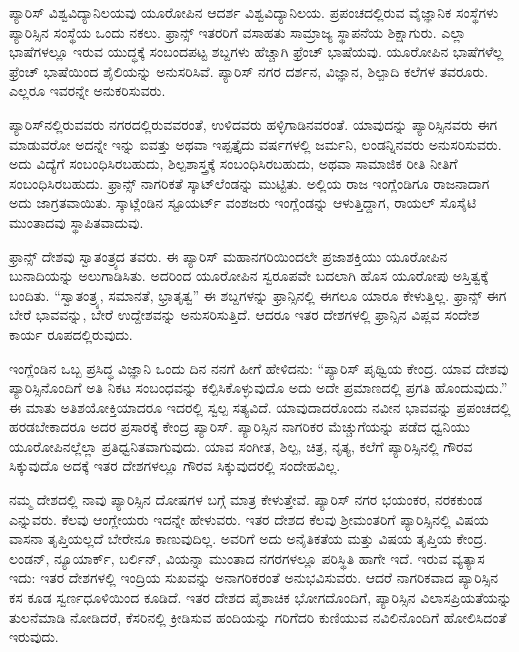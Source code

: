 \vskip 5pt

ಪ್ಯಾರಿಸ್​ ವಿಶ್ವವಿದ್ಯಾನಿಲಯವು ಯೂರೋಪಿನ ಆದರ್ಶ ವಿಶ್ವವಿದ್ಯಾನಿಲಯ. ಪ್ರಪಂಚದಲ್ಲಿರುವ ವೈಜ್ಞಾನಿಕ ಸಂಸ್ಥೆಗಳು ಪ್ಯಾರಿಸ್ಸಿನ ಸಂಸ್ಥೆಯ ಒಂದು ನಕಲು. ಫ್ರಾನ್ಸ್​ ಇತರರಿಗೆ ವಸಾಹತು ಸಾಮ್ರಾಜ್ಯ ಸ್ಥಾಪನೆಯ ಶಿಕ್ಷಾಗುರು. ಎಲ್ಲಾ ಭಾಷೆಗಳಲ್ಲೂ ಇರುವ ಯುದ್ಧಕ್ಕೆ ಸಂಬಂದಪಟ್ಟ ಶಬ್ದಗಳು ಹೆಚ್ಚಾಗಿ ಫ್ರೆಂಚ್​ ಭಾಷೆಯವು. ಯೂರೋಪಿನ ಭಾಷೆಗಳೆಲ್ಲ ಫ್ರೆಂಚ್​ ಭಾಷೆಯಿಂದ ಶೈಲಿಯನ್ನು ಅನುಸರಿಸಿವೆ. ಪ್ಯಾರಿಸ್​ ನಗರ ದರ್ಶನ, ವಿಜ್ಞಾನ, ಶಿಲ್ಪಾದಿ ಕಲೆಗಳ ತವರೂರು. ಎಲ್ಲರೂ ಇವರನ್ನೇ ಅನುಕರಿಸುವರು.

\newpage

ಪ್ಯಾರಿಸ್​ನಲ್ಲಿರುವವರು ನಗರದಲ್ಲಿರುವವರಂತೆ, ಉಳಿದವರು ಹಳ್ಳಿಗಾಡಿನವರಂತೆ. ಯಾವುದನ್ನು ಪ್ಯಾರಿಸ್ಸಿನವರು ಈಗ ಮಾಡುವರೋ ಅದನ್ನೇ ಇನ್ನು ಐವತ್ತು ಅಥವಾ ಇಪ್ಪತ್ತೈದು ವರ್ಷಗಳಲ್ಲಿ ಜರ್ಮನಿ, ಲಂಡನ್ನಿನವರು ಅನುಸರಿಸುವರು. ಅದು ವಿದ್ಯೆಗೆ ಸಂಬಂಧಿಸಿರಬಹುದು, ಶಿಲ್ಪಶಾಸ್ತ್ರಕ್ಕೆ ಸಂಬಂಧಿಸಿರಬಹುದು, ಅಥವಾ ಸಾಮಾಜಿಕ ರೀತಿ ನೀತಿಗೆ ಸಂಬಂಧಿಸಿರಬಹುದು. ಫ್ರಾನ್ಸ್​ ನಾಗರಿಕತೆ ಸ್ಕಾಟ್​ಲೆಂಡನ್ನು ಮುಟ್ಟಿತು. ಅಲ್ಲಿಯ ರಾಜ ಇಂಗ್ಲೆಂಡಿಗೂ ರಾಜನಾದಾಗ ಅದು ಜಾಗ್ರತವಾಯಿತು. ಸ್ಕಾಟ್ಲೆಂಡಿನ ಸ್ಟೂಯರ್ಟ್ ವಂಶಜರು ಇಂಗ್ಲೆಂಡನ್ನು ಆಳುತ್ತಿದ್ದಾಗ, ರಾಯಲ್​ ಸೊಸೈಟಿ ಮುಂತಾದವು ಸ್ಥಾಪಿತ\break ವಾದುವು.

ಫ್ರಾನ್ಸ್​ ದೇಶವು ಸ್ವಾತಂತ್ರ್ಯದ ತವರು. ಈ ಪ್ಯಾರಿಸ್​ ಮಹಾನಗರಿಯಿಂದಲೇ ಪ್ರಜಾ\break ಶಕ್ತಿಯು ಯೂರೋಪಿನ ಬುನಾದಿಯನ್ನು ಅಲುಗಾಡಿಸಿತು. ಅದರಿಂದ ಯೂರೋಪಿನ ಸ್ವರೂಪವೇ ಬದಲಾಗಿ ಹೊಸ ಯೂರೋಪು ಅಸ್ತಿತ್ವಕ್ಕೆ ಬಂದಿತು. “ಸ್ವಾತಂತ್ರ್ಯ, ಸಮಾನತೆ, ಭ್ರಾತೃತ್ವ” ಈ ಶಬ್ದಗಳನ್ನು ಫ್ರಾನ್ಸಿನಲ್ಲಿ ಈಗಲೂ ಯಾರೂ ಕೇಳುತ್ತಿಲ್ಲ. ಫ್ರಾನ್ಸ್​ ಈಗ ಬೇರೆ ಭಾವವನ್ನು, ಬೇರೆ ಉದ್ದೇಶವನ್ನು ಅನುಸರಿಸುತ್ತಿದೆ. ಆದರೂ ಇತರ ದೇಶಗಳಲ್ಲಿ ಫ್ರಾನ್ಸಿನ ವಿಪ್ಲವ ಸಂದೇಶ ಕಾರ್ಯ ರೂಪದಲ್ಲಿರುವುದು.

ಇಂಗ್ಲೆಂಡಿನ ಒಬ್ಬ ಪ್ರಸಿದ್ಧ ವಿಜ್ಞಾನಿ ಒಂದು ದಿನ ನನಗೆ ಹೀಗೆ ಹೇಳಿದನು: “ಪ್ಯಾರಿಸ್​ ಪೃಥ್ವಿಯ ಕೇಂದ್ರ. ಯಾವ ದೇಶವು ಪ್ಯಾರಿಸ್ಸಿನೊಂದಿಗೆ ಅತಿ ನಿಕಟ ಸಂಬಂಧವನ್ನು ಕಲ್ಪಿಸಿಕೊಳ್ಳುವುದೊ ಅದು ಅದೇ ಪ್ರಮಾಣದಲ್ಲಿ ಪ್ರಗತಿ ಹೊಂದುವುದು.” ಈ ಮಾತು ಅತಿಶಯೋಕ್ತಿಯಾದರೂ ಇದರಲ್ಲಿ ಸ್ವಲ್ಪ ಸತ್ಯವಿದೆ. ಯಾವುದಾದರೊಂದು ನವೀನ ಭಾವವನ್ನು ಪ್ರಪಂಚದಲ್ಲಿ ಹರಡಬೇಕಾದರೂ ಅದರ ಪ್ರಸಾರಕ್ಕೆ ಕೇಂದ್ರ ಪ್ಯಾರಿಸ್​. ಪ್ಯಾರಿಸ್ಸಿನ ನಾಗರಿಕರ ಮೆಚ್ಚುಗೆಯನ್ನು ಪಡೆದ ಧ್ವನಿಯು ಯೂರೋಪಿನಲ್ಲೆಲ್ಲಾ ಪ್ರತಿಧ್ವನಿತವಾಗು\break ವುದು. ಯಾವ ಸಂಗೀತ, ಶಿಲ್ಪ, ಚಿತ್ರ, ನೃತ್ಯ, ಕಲೆಗೆ ಪ್ಯಾರಿಸ್ಸಿನಲ್ಲಿ ಗೌರವ ಸಿಕ್ಕುವುದೊ ಅದಕ್ಕೆ ಇತರ ದೇಶಗಳಲ್ಲೂ ಗೌರವ ಸಿಕ್ಕುವುದರಲ್ಲಿ ಸಂದೇಹವಿಲ್ಲ.

ನಮ್ಮ ದೇಶದಲ್ಲಿ ನಾವು ಪ್ಯಾರಿಸ್ಸಿನ ದೋಷಗಳ ಬಗ್ಗೆ ಮಾತ್ರ ಕೇಳುತ್ತೇವೆ. ಪ್ಯಾರಿಸ್​ ನಗರ ಭಯಂಕರ, ನರಕಕುಂಡ ಎನ್ನುವರು. ಕೆಲವು ಆಂಗ್ಲೇಯರು ಇದನ್ನೇ ಹೇಳುವರು. ಇತರ ದೇಶದ ಕೆಲವು ಶ‍್ರೀಮಂತರಿಗೆ ಪ್ಯಾರಿಸ್ಸಿನಲ್ಲಿ ವಿಷಯ ವಾಸನಾ ತೃಪ್ತಿಯಲ್ಲದೆ ಬೇರೇನೂ ಕಾಣುವುದಿಲ್ಲ. ಅವರಿಗೆ ಅದು ಅನೈತಿಕತೆಯ ಮತ್ತು ವಿಷಯ ತೃಪ್ತಿಯ ಕೇಂದ್ರ. ಲಂಡನ್​, ನ್ಯೂಯಾರ್ಕ್​, ಬರ್ಲಿನ್​, ವಿಯನ್ನಾ ಮುಂತಾದ ನಗರಗಳಲ್ಲೂ ಪರಿಸ್ಥಿತಿ ಹಾಗೇ ಇದೆ. ಇರುವ ವ್ಯತ್ಯಾಸ ಇದು: ಇತರ ದೇಶಗಳಲ್ಲಿ ಇಂದ್ರಿಯ ಸುಖವನ್ನು ಅನಾಗರಿಕರಂತೆ ಅನುಭವಿಸುವರು. ಆದರೆ ನಾಗರಿಕವಾದ ಪ್ಯಾರಿಸ್ಸಿನ ಕಸ ಕೂಡ ಸ್ವರ್ಣಧೂಳಿಯಿಂದ ಕೂಡಿದೆ. ಇತರ ದೇಶದ ಪೈಶಾಚಿಕ ಭೋಗದೊಂದಿಗೆ, ಪ್ಯಾರಿಸ್ಸಿನ ವಿಲಾಸಪ್ರಿಯತೆಯನ್ನು ತುಲನೆಮಾಡಿ ನೋಡಿದರೆ, ಕೆಸರಿನಲ್ಲಿ ಕ್ರೀಡಿಸುವ ಹಂದಿಯನ್ನು ಗರಿಗೆದರಿ ಕುಣಿಯುವ ನವಿಲಿನೊಂದಿಗೆ ಹೋಲಿಸಿದಂತೆ ಇರುವುದು.


